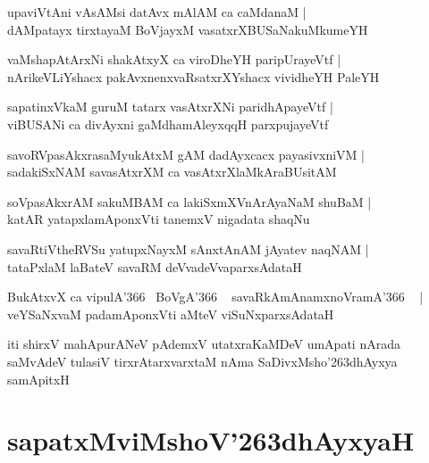 \documentclass[twoside,12pt,openright]{book}
\def\S{\char'263}
\newcounter{shloka}[chapter]
\begin{document}
\begin{shloka}%
upaviVtAni vAsAMsi datAvx mAlAM ca caMdanaM |\\
dAMpatayx tirxtayaM BoVjayxM vasatxrXBUSaNakuMkumeYH 
\end{shloka}

\begin{shloka}%
vaMshapAtArxNi shakAtxyX ca viroDheYH paripUrayeVtf |\\
nArikeVLiYshacx pakAvxnenxvaRsatxrXYshacx vividheYH PaleYH
\end{shloka}

\begin{shloka}%
sapatinxVkaM guruM tatarx vasAtxrXNi paridhApayeVtf |\\
viBUSANi ca divAyxni gaMdhamAleyxqqH parxpujayeVtf
\end{shloka}

\begin{shloka}%
savoRVpasAkxrasaMyukAtxM gAM dadAyxcacx payasivxniVM |\\
sadakiSxNAM savasAtxrXM ca vasAtxrXlaMkAraBUsitAM
\end{shloka}

\begin{shloka}%
soVpasAkxrAM sakuMBAM ca lakiSxmXVnArAyaNaM shuBaM |\\
katAR yatapxlamAponxVti tanemxV nigadata shaqNu
\end{shloka}

\begin{shloka}%
savaRtiVtheRVSu yatupxNayxM sAnxtAnAM jAyatev naqNAM |\\
tataPxlaM laBateV savaRM deVvadeVvaparxsAdataH
\end{shloka}

\begin{shloka}%
BukAtxvX ca vipulA\char'366 ~BoVgA\char'366 ~ savaRkAmAnamxnoVramA\char'366 ~ |\\
veYSaNxvaM padamAponxVti aMteV viSuNxparxsAdataH
\end{shloka}

\begin{center}
iti shirxV mahApurANeV pAdemxV utatxraKaMDeV umApati nArada saMvAdeV tulasiV 
tirxrAtarxvarxtaM nAma SaDivxMsho\S dhAyxya samApitxH
\end{center}

\chapter{sapatxMviMshoV\S dhAyxyaH}
\end{document}
